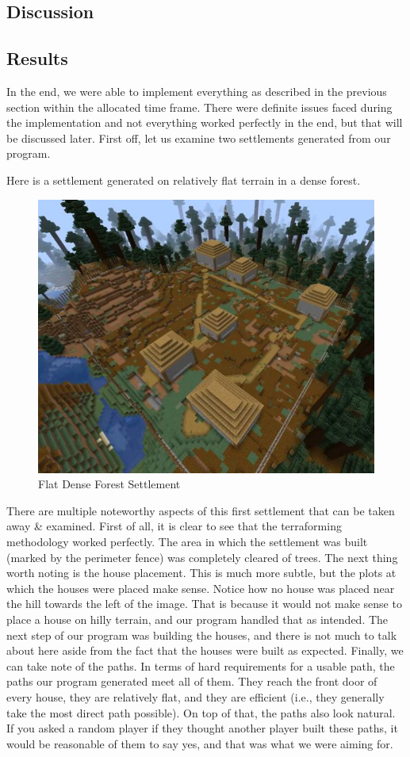 \documentclass[11pt, oneside]{article}
\begin{document}
\begin{normalsize}
\section{Discussion}
\label{Discussion}

\subsection{Results}

In the end, we were able to implement everything as described in the previous section within the allocated time frame. 
There were definite issues faced during the implementation and not everything worked perfectly in the end, but that will be discussed later. 
First off, let us examine two settlements generated from our program. 

Here is a settlement generated on relatively flat terrain in a dense forest. 
\begin{figure}[H]
    \centering
    \includegraphics[width=0.75\linewidth]{village1}
    \caption{Flat Dense Forest Settlement}
    \label{fig:forest}
\end{figure}

There are multiple noteworthy aspects of this first settlement that can be taken away \& examined. 
First of all, it is clear to see that the terraforming methodology worked perfectly. 
The area in which the settlement was built (marked by the perimeter fence) was completely cleared of trees. 
The next thing worth noting is the house placement. 
This is much more subtle, but the plots at which the houses were placed make sense.
Notice how no house was placed near the hill towards the left of the image. That is because it would not make sense to place a house on hilly terrain, and our program handled that as intended. 
The next step of our program was building the houses, and there is not much to talk about here aside from the fact that the houses were built as expected. 
Finally, we can take note of the paths. 
In terms of hard requirements for a usable path, the paths our program generated meet all of them. 
They reach the front door of every house, they are relatively flat, and they are efficient (i.e., they generally take the most direct path possible). 
On top of that, the paths also look natural. 
If you asked a random player if they thought another player built these paths, it would be reasonable of them to say yes, and that was what we were aiming for. 


\end{normalsize}
\end{document}
